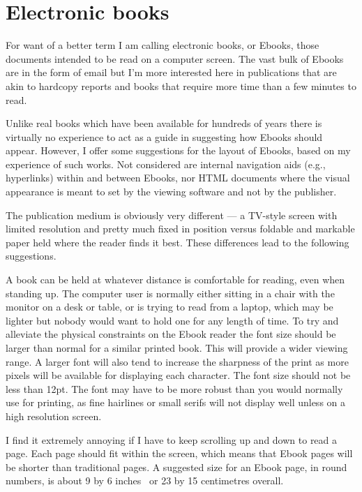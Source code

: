 \documentclass[10pt,a4paper,extrafontsizes]{memoir}
\begin{document}

\section{Electronic books}

\begin{paracol}{2}
\switchEng
    For want of a better term I am calling electronic books, or Ebooks, 
those documents intended to be read on a computer screen. The vast bulk
of Ebooks are in the form of email but I'm more interested here in 
publications that are akin to hardcopy reports and books that require
more time than a few minutes to read.

    Unlike real books which have been available for hundreds of years there
is virtually no experience to act as a guide in suggesting how Ebooks should
appear. However, I offer some suggestions for the layout of Ebooks, based on
my experience of such works. 
Not considered are internal navigation aids
(e.g., hyperlinks) within and between Ebooks, nor HTML documents where
the visual appearance is meant to set by the viewing software and not 
by the publisher.

    The publication medium is obviously very different --- a TV-style 
screen with limited resolution and pretty much fixed in position versus
foldable and markable paper held where the reader finds it best.
These differences lead to the following suggestions.

    A book can be held at whatever distance is comfortable for reading, even
when standing up.
The computer user is normally either sitting in a chair with the monitor
on a desk or table, or is trying to read from a laptop, which may be 
lighter but nobody would want to hold one for any length of time. To try
and alleviate the physical constraints on the Ebook reader the font size
should be larger than normal for a similar printed book. This will provide
a wider viewing range. A larger font will also tend to
increase the sharpness of the print as more pixels will be available for
displaying each character.
    The font size should not be less than 12pt. The font may have to be
more robust than you would normally use for printing, as fine hairlines 
or small serifs will not display well unless on a high resolution screen.

    I find it extremely annoying if I have to keep scrolling up and down
to read a page. Each page should fit within the screen, which means that
Ebook pages will be shorter than traditional pages. 
A suggested size for an Ebook page, in round numbers, is 
about 9 by 6 inches~\autocite{ADOBEBOOK} or 23 by 15 centimetres overall.


\end{paracol}
\end{document}
